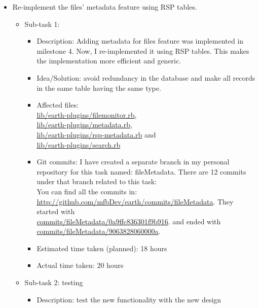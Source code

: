 \documentclass{article}
\begin{document}
\begin{itemize}
	\item Re-implement the files' metadata feature using RSP tables.
	     \begin{itemize}
	      \item Sub-task 1: 
	           \begin{itemize}
					\item Description: Adding metadata for files feature was implemented in milestone 4. Now, I re-implemented it using RSP tables. This makes the implementation more efficient and generic.  
					\item Idea/Solution: avoid redundancy in the database and make all records in the same table having the same type.
					\item Affected files:\\ 
\href{http://github.com/mfbDev/earth/tree/master/lib/earth_plugins/file_monitor.rb}{lib/earth-plugins/filemonitor.rb},\\
\href{http://github.com/mfbDev/earth/tree/master/lib/earth_plugins/metadata.rb}{lib/earth-plugins/metadata.rb},\\
\href{http://github.com/mfbDev/earth/tree/master/lib/earth_plugins/rsp_metadata.rb}{lib/earth-plugins/rsp-metadata.rb} and\\
\href{http://github.com/mfbDev/earth/tree/master/lib/earth_plugins/search_by_kv_pairs.rb}{lib/earth-plugins/search.rb}
					\item Git commits: I have created a separate branch in my personal repository for this task named: fileMetadata. There are 12 commits under that branch related to this task:\\
You can find all the commits in: \href{http://github.com/mfbDev/earth/commits/fileMetadata}{http://github.com/mfbDev/earth/commits/fileMetadata}.
They started with \\
\href{http://github.com/mfbDev/earth/commits/fileMetadata/0a9ffc836301f9b916}{commits/fileMetadata/0a9ffc836301f9b916}.
and ended with \\
\href{http://github.com/mfbDev/earth/commits/fileMetadata/9063828060000a}{commits/fileMetadata/9063828060000a}. 
					\item Estimated time taken (planned): 18 hours
					\item Actual time taken: 20 hours
				\end{itemize}
			\item Sub-task 2: testing
			   \begin{itemize}
					\item Description: test the new functionality with the new design

\end{itemize}
\end{itemize}
\end{itemize}
\end{document}
